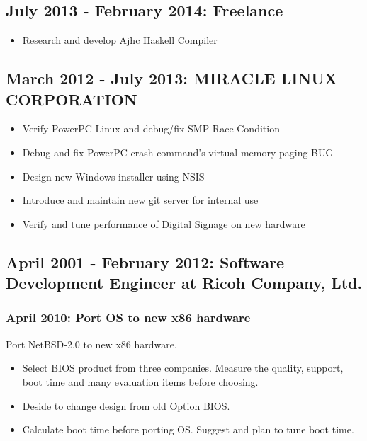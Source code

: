 \documentclass[letterpaper]{article}
\begin{document}
\subsection*{July 2013 - February 2014: Freelance}

\begin{itemize}
  \item Research and develop Ajhc Haskell Compiler
\end{itemize}

\subsection*{March 2012 - July 2013: MIRACLE LINUX CORPORATION}

\begin{itemize}
  \item Verify PowerPC Linux and debug/fix SMP Race Condition
  \item Debug and fix PowerPC crash command's virtual memory paging BUG
  \item Design new Windows installer using NSIS
  \item Introduce and maintain new git server for internal use
  \item Verify and tune performance of Digital Signage on new hardware
\end{itemize}

\subsection*{April 2001 - February 2012: Software Development Engineer at Ricoh Company, Ltd.}
\subsubsection*{April 2010: Port OS to new x86 hardware}
Port NetBSD-2.0 to new x86 hardware.

\begin{itemize}
  \item Select BIOS product from three companies. Measure the quality, support, boot time and many evaluation items before choosing.
  \item Deside to change design from old Option BIOS.
  \item Calculate boot time before porting OS. Suggest and plan to tune boot time.
\end{itemize}
\end{document}
